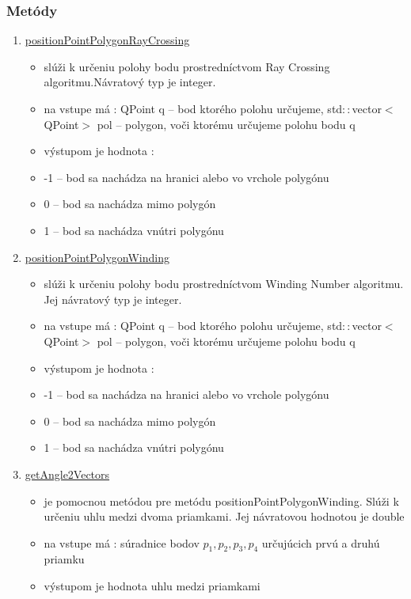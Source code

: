 \documentclass[12pt]{article}
\begin{document}
\subsubsection{Metódy}

\begin{enumerate}
\item[] \underline{positionPointPolygonRayCrossing}
\begin{itemize}
\item slúži k určeniu polohy bodu prostredníctvom Ray Crossing algoritmu.Návratový typ je integer.

\item na vstupe má : QPoint q -- bod ktorého polohu určujeme, std$::$vector$<$QPoint$>$ pol -- polygon, voči ktorému určujeme polohu bodu q  

\item výstupom je hodnota :
\item[] -1 – bod sa nachádza na hranici alebo vo vrchole polygónu
\item[] 0 – bod sa nachádza mimo polygón
\item[] 1 – bod sa nachádza vnútri polygónu

\end{itemize}
\item[] \underline{positionPointPolygonWinding}
\begin{itemize}
\item slúži k určeniu polohy bodu prostredníctvom Winding Number algoritmu. Jej návratový typ je integer.
\item na vstupe má : QPoint q – bod ktorého polohu určujeme, std$::$vector$<$QPoint$>$ pol – polygon, voči ktorému určujeme polohu bodu q
\item výstupom je hodnota :
\item[] -1 – bod sa nachádza na hranici alebo vo vrchole polygónu
\item[] 0 – bod sa nachádza mimo polygón
\item[] 1 – bod sa nachádza vnútri polygónu
\end{itemize}

\item[] \underline{getAngle2Vectors}
\begin{itemize}
\item je pomocnou metódou pre metódu positionPointPolygonWinding. Slúži k určeniu uhlu medzi dvoma priamkami. Jej návratovou hodnotou je double
\item na vstupe má : súradnice bodov $p_1, p_2, p_3, p_4$ určujúcich prvú a druhú priamku
\item výstupom je hodnota uhlu medzi priamkami 
\end{itemize}


\end{enumerate}
\end{document}
